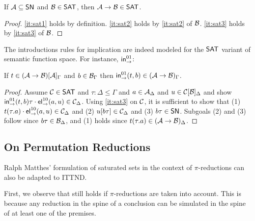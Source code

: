 \begin{lemma}
  \label{lem:fun-sat}
  If $\mathcal{A} \subseteq \mathsf{SN}$ and $\mathcal{B} \in \mathsf{SAT}$, then $\mathcal{A} \to \mathcal{B} \in \mathsf{SAT}$.
\end{lemma}
\begin{proof}
  \ref{it:sat1} holds by definition.
  \ref{it:sat2} holds by \ref{it:sat2} of $\mathcal{B}$.
  \ref{it:sat3} holds by \ref{it:sat3} of $\mathcal{B}$.
\end{proof}

The introductions rules for implication are indeed modeled for the
$\mathsf{SAT}$ variant of semantic function space.  For instance, $\mathsf{in}_{\to}^{01}$:
\begin{lemma}
  \label{lem:intro-sat}
  If $t \in (\mathcal{A} \to \mathcal{B})[\mathcal{A}]_{\Gamma}$
  and $b \in \mathcal{B}_{\Gamma}$ then
  $\mathsf{in}_{\to}^{01}(t,b) \in (\mathcal{A} \to \mathcal{B})_{\Gamma}$.
\end{lemma}
\begin{proof}
  Assume
  $\mathcal{C} \in \mathsf{SAT}$ and
  $\tau : \Delta \leq \Gamma$ and
  $a \in \mathcal{A}_{\Delta}$ and $u \in \mathcal{C}[\mathcal{B}]_{\Delta}$ and
  show
  $\mathsf{in}_{\to}^{01}(t,b)\tau \cdot \mathsf{el}_{\to}^{10}(a,u) \in \mathcal{C}_{\Delta}$.
  Using \ref{it:sat3} on $\mathcal{C}$, it is sufficient to show that
  (1) $t(\tau.a) \cdot \mathsf{el}_{\to}^{10}(a,u) \in \mathcal{C}_{\Delta}$ and
  (2) $u[b\tau] \in \mathcal{C}_{\Delta}$ and
  (3) $b\tau \in \mathsf{SN}$.
  Subgoals (2) and (3) follow since $b\tau \in \mathcal{B}_{\Delta}$,
  and (1) holds since $t(\tau.a) \in (\mathcal{A} \to \mathcal{B})_{\Delta}$.
\end{proof}


\subsection{On Permutation Reductions}
\label{sec:sat-perm}

Ralph Matthes' \cite{matthes:classlog} formulation of saturated sets in
the context of $\pi$-reductions can also be adapted to ITTND.

First, we observe that  still holds if
$\pi$-reductions are taken into account.  This is because any
reduction in the spine of a conclusion can be simulated in the spine
of at least one of the premises.

